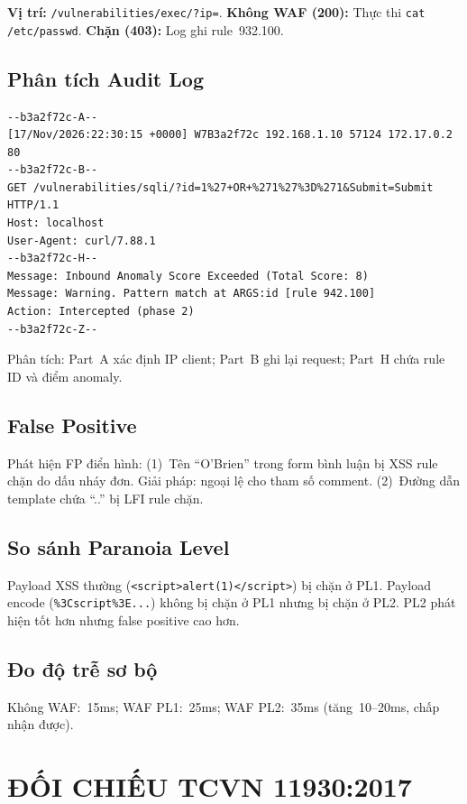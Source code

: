 \documentclass[12pt,a4paper,twoside]{report}
\begin{document}
\textbf{Vị trí:} \texttt{/vulnerabilities/exec/?ip=}. \textbf{Không WAF (200):} Thực thi \texttt{cat /etc/passwd}. \textbf{Chặn (403):} Log ghi rule~932.100.

\section{Phân tích Audit Log}

\begin{lstlisting}[caption=Audit log mẫu (SQLi bị chặn),basicstyle=\tiny\ttfamily]
--b3a2f72c-A--
[17/Nov/2026:22:30:15 +0000] W7B3a2f72c 192.168.1.10 57124 172.17.0.2 80
--b3a2f72c-B--
GET /vulnerabilities/sqli/?id=1%27+OR+%271%27%3D%271&Submit=Submit HTTP/1.1
Host: localhost
User-Agent: curl/7.88.1
--b3a2f72c-H--
Message: Inbound Anomaly Score Exceeded (Total Score: 8)
Message: Warning. Pattern match at ARGS:id [rule 942.100]
Action: Intercepted (phase 2)
--b3a2f72c-Z--
\end{lstlisting}

Phân tích: Part~A xác định IP client; Part~B ghi lại request; Part~H chứa rule ID và điểm anomaly.

\section{False Positive}

Phát hiện FP điển hình: (1)~Tên ``O'Brien'' trong form bình luận bị XSS rule chặn do dấu nháy đơn. Giải pháp: ngoại lệ cho tham số comment. (2)~Đường dẫn template chứa ``..'' bị LFI rule chặn.

\section{So sánh Paranoia Level}

Payload XSS thường (\texttt{<script>alert(1)</script>}) bị chặn ở PL1. Payload encode (\texttt{\%3Cscript\%3E...}) không bị chặn ở PL1 nhưng bị chặn ở PL2. PL2 phát hiện tốt hơn nhưng false positive cao hơn.

\section{Đo độ trễ sơ bộ}

Không WAF:~15ms; WAF PL1:~25ms; WAF PL2:~35ms (tăng~10--20ms, chấp nhận được).

\chapter{ĐỐI CHIẾU TCVN 11930:2017}
\end{document}
